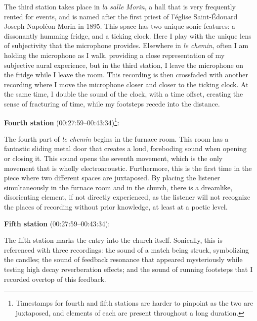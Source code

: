 \documentclass[12pt,twoside,maitrise]{dms_ks}
\theoremstyle{definition}
\begin{document}
{The third station takes place in \textit{la salle Morin}, a hall that is very frequently rented for events, and is named after the first priest of l'église Saint-Édouard Joseph-Napoléon Morin in 1895. 
This space has two unique sonic features: a dissonantly humming fridge, and a ticking clock. 
Here I play with the unique lens of subjectivity that the microphone provides. 
Elsewhere in \textit{le chemin}, often I am holding the microphone as I walk, providing a close representation of my subjective aural experience, but in the third station, I leave the microphone on the fridge while I leave the room. 
This recording is then crossfaded with another recording where I move the microphone closer and closer to the ticking clock. 
At the same time, I double the sound of the clock, with a time offset, creating the sense of fracturing of time, while my footsteps recede into the distance.

\textbf{Fourth station} (00:27:59--00:43:34)\footnote{Timestamps for fourth and fifth stations are harder to pinpoint as the two are juxtaposed, and elements of each are present throughout a long duration.}:


The fourth part of \textit{le chemin} begins in the furnace room. 
This room has a fantastic sliding metal door that creates a loud, foreboding sound when opening or closing it. 
This sound opens the seventh movement, which is the only movement that is wholly electroacoustic. 
Furthermore, this is the first time in the piece where two different spaces are juxtaposed. 
By placing the listener simultaneously in the furnace room and in the church, there is a dreamlike, disorienting element, if not directly experienced, as the listener will not recognize the places of recording without prior knowledge, at least at a poetic level.

\textbf{Fifth station} (00:27:59--00:43:34):


The fifth station marks the entry into the church itself. 
Sonically, this is referenced with three recordings: the sound of a match being struck, symbolizing the candles; the sound of feedback resonance that appeared mysteriously while testing high decay reverberation effects; and the sound of running footsteps that I recorded overtop of this feedback. 

}
\end{document}
